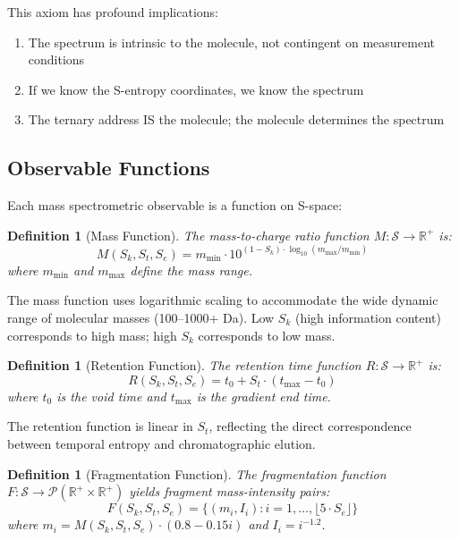 \documentclass[twocolumn,10pt]{article}
\newtheorem{definition}[theorem]{Definition}
\begin{document}
This axiom has profound implications:
\begin{enumerate}
\item The spectrum is intrinsic to the molecule, not contingent on measurement conditions
\item If we know the S-entropy coordinates, we know the spectrum
\item The ternary address IS the molecule; the molecule determines the spectrum
\end{enumerate}

\subsection{Observable Functions}

Each mass spectrometric observable is a function on S-space:

\begin{definition}[Mass Function]
The mass-to-charge ratio function $M: \mathcal{S} \to \mathbb{R}^+$ is:
\begin{equation}
M(S_k, S_t, S_e) = m_{\min} \cdot 10^{(1-S_k) \cdot \log_{10}(m_{\max}/m_{\min})}
\end{equation}
where $m_{\min}$ and $m_{\max}$ define the mass range.
\end{definition}

The mass function uses logarithmic scaling to accommodate the wide dynamic range of molecular masses (100--1000+ Da). Low $S_k$ (high information content) corresponds to high mass; high $S_k$ corresponds to low mass.

\begin{definition}[Retention Function]
The retention time function $R: \mathcal{S} \to \mathbb{R}^+$ is:
\begin{equation}
R(S_k, S_t, S_e) = t_0 + S_t \cdot (t_{\max} - t_0)
\end{equation}
where $t_0$ is the void time and $t_{\max}$ is the gradient end time.
\end{definition}

The retention function is linear in $S_t$, reflecting the direct correspondence between temporal entropy and chromatographic elution.

\begin{definition}[Fragmentation Function]
The fragmentation function $F: \mathcal{S} \to \mathcal{P}(\mathbb{R}^+ \times \mathbb{R}^+)$ yields fragment mass-intensity pairs:
\begin{equation}
F(S_k, S_t, S_e) = \{(m_i, I_i) : i = 1, \ldots, \lfloor 5 \cdot S_e \rfloor\}
\end{equation}
where $m_i = M(S_k, S_t, S_e) \cdot (0.8 - 0.15i)$ and $I_i = i^{-1.2}$.
\end{definition}
\end{document}
